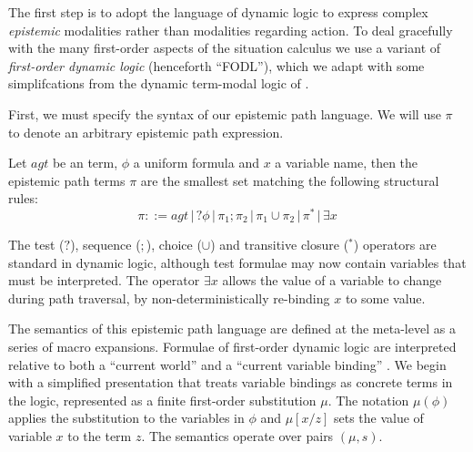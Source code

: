 The first step is to adopt the language of dynamic logic to express
complex \emph{epistemic} modalities rather than modalities regarding
action. To deal gracefully with the many first-order aspects of the
situation calculus we use a variant of \emph{first-order dynamic logic}
(henceforth {}``FODL''), which we adapt with some simplifcations
from the dynamic term-modal logic of \citet{kooi07dyn_termmodal_logic}.

First, we must specify the syntax of our epistemic path language.
We will use $\pi$ to denote an arbitrary epistemic path expression.

\begin{defnL}
 Let $agt$ be an term, $\phi$
a uniform formula and $x$ a variable name, then the epistemic path
terms $\pi$ are the smallest set matching the following structural
rules:\[
\pi::=agt\,|\,?\phi\,|\,\pi_{1};\pi_{2}\,|\,\pi_{1}\cup\pi_{2}\,|\,\pi^{*}\,|\,\exists x\]

\end{defnL}
The test ($?$), sequence ($;$), choice ($\cup$) and transitive
closure ($^{*}$) operators are standard in dynamic logic, although
test formulae may now contain variables that must be interpreted.
The operator $\exists x$ allows the value of a variable to change
during path traversal, by non-deterministically re-binding $x$ to
some value.

The semantics of this epistemic path language are defined at the meta-level
as a series of macro expansions. Formulae of first-order dynamic logic
are interpreted relative to both a {}``current world'' and a {}``current
variable binding'' \citep{kooi07dyn_termmodal_logic}. We begin with
a simplified presentation that treats variable bindings as concrete
terms in the logic, represented as a finite first-order substitution
$\mu$. The notation $\mu(\phi)$ applies the substitution to the
variables in $\phi$ and $\mu[x/z]$ sets the value of variable $x$
to the term $z$. The semantics operate over pairs $(\mu,s)$.

